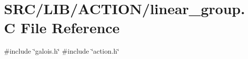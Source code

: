 \hypertarget{linear__group_8_c}{}\section{S\+R\+C/\+L\+I\+B/\+A\+C\+T\+I\+O\+N/linear\+\_\+group.C File Reference}
\label{linear__group_8_c}
{\ttfamily \#include \char`\"{}galois.\+h\char`\"{}}\newline
{\ttfamily \#include \char`\"{}action.\+h\char`\"{}}\newline
